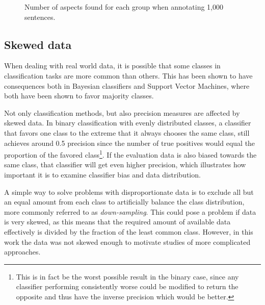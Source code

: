 \documentclass[a4paper,11pt]{kth-mag}
\begin{document}
\begin{figure}[t]
  \centering
  \caption{Number of aspects found for each group when annotating 1,000 sentences.}
  \label{fig:cat_count}
\end{figure}

\subsection{Skewed data}
\label{subsec:data_skew}
When dealing with real world data, it is possible that some classes in classification tasks are more
common than others. This has been shown to have consequences both in Bayesian classifiers\cite{rennie2003bias}
and Support Vector Machines\cite{svm_bias}, where both have been shown to favor majority
classes.

Not only classification methods, but also precision measures are affected by skewed data. In binary
classification with evenly distributed classes, a classifier that favors one class to the extreme that it
always chooses the same class, still achieves around 0.5 precision since the number of true positives
would equal the proportion of the favored class\footnote{This is in fact be the worst possible result
in the binary case, since any classifier performing consistently worse could be modified to return the
opposite and thus have the inverse precision which would be better.}.
If the evaluation data is also biased towards the same class, that classifier will get even
higher precision, which illustrates how important it is to examine classifier
bias and data distribution.

A simple way to solve problems with disproportionate data is to exclude all but an equal amount
from each class to artificially balance the class distribution,
more commonly referred to as \emph{down-sampling}\cite{provost2000machine}.
This could pose a problem if data is very skewed, as this means that the required
amount of available data effectively is divided by the fraction of the least common class.
However, in this work the data was not skewed enough to motivate studies of more
complicated approaches.
\end{document}
